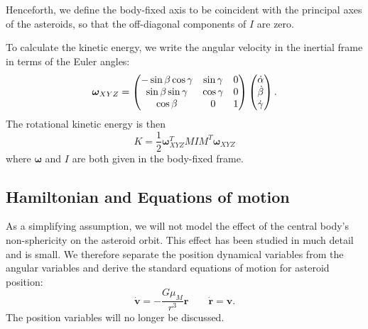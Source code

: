 \documentclass[11pt]{article}
\begin{document}
Henceforth, we define the body-fixed axis to be coincident with the principal axes of the asteroids, so that the off-diagonal components of $I$ are zero.

To calculate the kinetic energy, we write the angular velocity in the inertial frame in terms of the Euler angles:
\begin{equation}
\bm \omega_{XYZ} = \left( \begin{matrix}
-\sin\beta \cos \gamma & \sin \gamma & 0\\
\sin \beta \sin \gamma & \cos \gamma & 0 \\
\cos \beta & 0 & 1
\end{matrix} \right)
\left( \begin{matrix}
\dot \alpha\\
\dot \beta \\
\dot \gamma
\end{matrix} \right).
\label{eqn:ang-vel}
\end{equation}
The rotational kinetic energy is then
\begin{equation}
K = \frac{1}{2} \bm\omega_{XYZ}^T M I M^T \bm \omega_{XYZ}
\label{eqn:ke}
\end{equation}
where $\bm \omega$ and $I$ are both given in the body-fixed frame.




\subsection{Hamiltonian and Equations of motion}
As a simplifying assumption, we will not model the effect of the central body's non-sphericity on the asteroid orbit. This effect has been studied in much detail and is small. We therefore separate the position dynamical variables from the angular variables and derive the standard equations of motion for asteroid position:
\begin{equation}
\dot{\bm{v}} = -\frac{G\mu_M}{r^3}\bm{r}\qquad \dot{\bm{r}} = \bm{v}.
\label{eqn:translaton-eom}
\end{equation}
The position variables will no longer be discussed.
\end{document}
